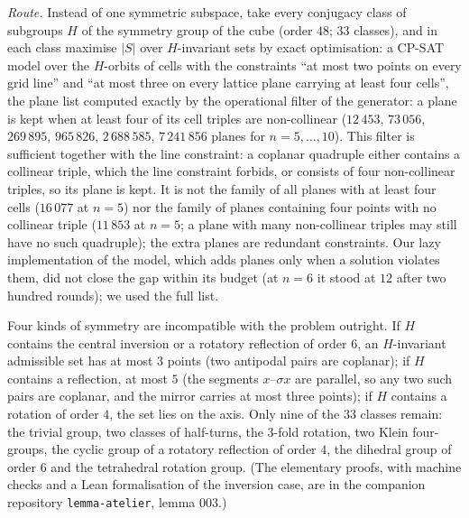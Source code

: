 \documentclass[11pt,a4paper]{article}
\begin{document}
\emph{Route.}  Instead of one symmetric subspace, take every conjugacy class of subgroups $H$
of the symmetry group of the cube (order $48$; $33$ classes), and in each class maximise $|S|$
over $H$-invariant sets by exact optimisation: a CP-SAT model over the $H$-orbits of cells with the
constraints ``at most two points on every grid line'' and ``at most three on every lattice plane
carrying at least four cells'', the plane list computed exactly by the operational filter of the generator: a plane
is kept when at least four of its cell triples are non-collinear ($12\,453$, $73\,056$, $269\,895$, $965\,826$,
$2\,688\,585$, $7\,241\,856$ planes for $n=5,\dots,10$).  This filter is sufficient together with the line constraint:
a coplanar quadruple either contains a collinear triple, which the line constraint forbids, or consists of four
non-collinear triples, so its plane is kept.  It is not the family of all planes with at least four cells
($16\,077$ at $n=5$) nor the family of planes containing four points with no collinear triple ($11\,853$ at $n=5$;
a plane with many non-collinear triples may still have no such quadruple); the extra planes are redundant
constraints.  Our lazy implementation of the model,
which adds planes only when a solution violates them, did not close the gap within its budget (at
$n=6$ it stood at $12$ after two hundred rounds); we used the full list.

Four kinds of symmetry are incompatible with the problem outright.  If $H$ contains the central
inversion or a rotatory reflection of order $6$, an $H$-invariant admissible set has at most $3$
points (two antipodal pairs are coplanar); if $H$ contains a reflection, at most $5$ (the segments
$x$--$\sigma x$ are parallel, so any two such pairs are coplanar, and the mirror carries at most
three points); if $H$ contains a rotation of order $4$, the set lies on the axis.  Only nine of the
$33$ classes remain: the trivial group, two classes of half-turns, the $3$-fold rotation, two
Klein four-groups, the cyclic group of a rotatory reflection of order $4$, the dihedral group
of order $6$ and the tetrahedral rotation group.  (The elementary proofs, with machine checks
and a Lean formalisation of the inversion case, are in the companion repository
\texttt{lemma-atelier}, lemma 003.)
\end{document}

